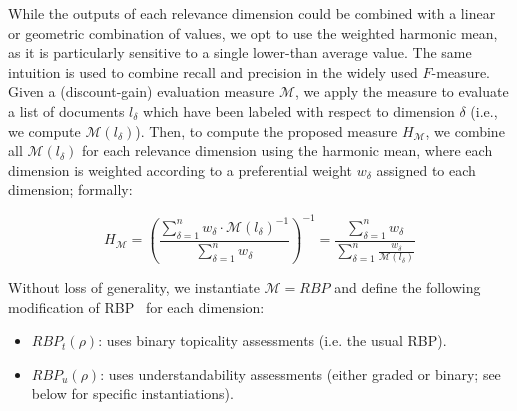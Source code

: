 While the outputs of each relevance dimension could be combined with a linear or geometric combination of values, we opt to use the weighted harmonic mean, as it is particularly sensitive to a single lower-than average value. The same intuition is used to combine recall and precision in the widely used $F$-measure. 
Given a (discount-gain) evaluation measure $\mathcal{M}$, we apply the measure to evaluate a list of  documents $l_\delta$ which have been labeled with respect to dimension $\delta$ (i.e., we compute $\mathcal{M}(l_\delta)$). Then, to compute the proposed measure $H_\mathcal{M}$, we combine all $\mathcal{M}(l_\delta)$ for each relevance dimension using the harmonic mean, where each dimension is weighted according to a preferential weight $w_\delta$ assigned to each dimension; formally:

\vspace{-4pt}
\begin{equation}
    H_\mathcal{M}  = \left( \frac{\sum\limits_{\delta=1}^n w_\delta \cdot \mathcal{M}(l_\delta)^{-1}}{\sum\limits_{\delta=1}^n w_\delta} \right)^{-1}
          = \frac{\sum\limits_{\delta=1}^n w_\delta}{\sum\limits_{\delta=1}^n \frac{w_\delta}{\mathcal{M}(l_\delta)}}
\label{eq:H}
\end{equation}

%
%
%


%
Without loss of generality, we instantiate $\mathcal{M} = RBP$ and define the following modification of RBP~\cite{moffat08} for each dimension:
%
\begin{itemize}[leftmargin=*]
	\item $RBP_t(\rho)$: uses binary topicality assessments (i.e. the usual RBP). 
%	
    \item $RBP_u(\rho)$: uses understandability assessments (either graded or binary; see below for specific instantiations). %
\end{itemize}

